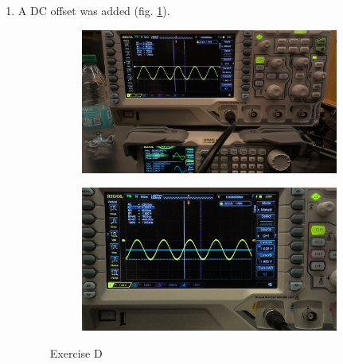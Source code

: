 \documentclass{article}
\begin{document}
\begin{enumerate}[label=(\alph*)]
                \item A DC offset was added (fig. \ref{exd}).
                \begin{figure}[p]
                    \begin{subfigure}{\textwidth/2}
                        \includegraphics[width=\linewidth]{d v.jpg}
                        \caption{}
                    \end{subfigure}
                    \begin{subfigure}{\textwidth/2}
                        \includegraphics[width=\linewidth]{d offset.jpg}
                        \caption{}
                    \end{subfigure}
                    \caption{Exercise D}
                    \label{exd}
                \end{figure}
                

\end{enumerate}
\end{document}
